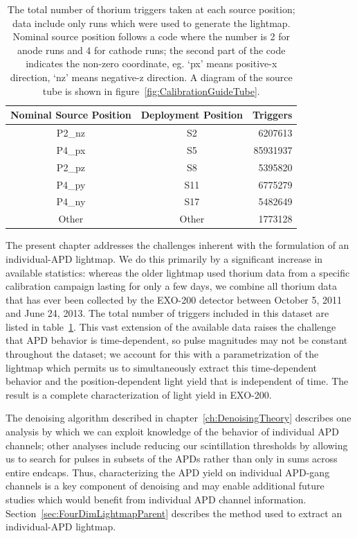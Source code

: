 \begin{table}
\begin{center}
\begin{tabular}{|c|c|r|}
\hline Nominal Source Position & Deployment Position & Triggers \\
\hline P2\_nz & S2 & 6207613 \\
P4\_px & S5 & 85931937 \\
P2\_pz & S8 & 5395820 \\
P4\_py & S11 & 6775279 \\
P4\_ny & S17 & 5482649 \\
Other & Other & 1773128 \\ \hline
\end{tabular}
\end{center}
\caption{The total number of thorium triggers taken at each source position; data include only runs which were used to generate the lightmap.  Nominal source position follows a code where the number is 2 for anode runs and 4 for cathode runs; the second part of the code indicates the non-zero coordinate, eg. `px' means positive-x direction, `nz' means negative-z direction.  A diagram of the source tube is shown in figure~\ref{fig:CalibrationGuideTube}.}
\label{tab:TriggerStatsBySourcePos}
\end{table}

The present chapter addresses the challenges inherent with the formulation of an individual-APD lightmap.  We do this primarily by a significant increase in available statistics: whereas the older lightmap used thorium data from a specific calibration campaign lasting for only a few days, we combine all thorium data that has ever been collected by the EXO-200 detector between October 5, 2011 and June 24, 2013.  The total number of triggers included in this dataset are listed in table~\ref{tab:TriggerStatsBySourcePos}.  This vast extension of the available data raises the challenge that APD behavior is time-dependent, so pulse magnitudes may not be constant throughout the dataset; we account for this with a parametrization of the lightmap which permits us to simultaneously extract this time-dependent behavior and the position-dependent light yield that is independent of time.  The result is a complete characterization of light yield in EXO-200.

The denoising algorithm described in chapter~\ref{ch:DenoisingTheory} describes one analysis by which we can exploit knowledge of the behavior of individual APD channels; other analyses include reducing our scintillation thresholds by allowing us to search for pulses in subsets of the APDs rather than only in sums across entire endcaps.  Thus, characterizing the APD yield on individual APD-gang channels is a key component of denoising and may enable additional future studies which would benefit from individual APD channel information.  Section~\ref{sec:FourDimLightmapParent} describes the method used to extract an individual-APD lightmap.

